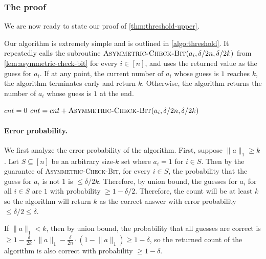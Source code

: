 \subsubsection{The proof}
We are now ready to state our proof of \cref{thm:threshold-upper}.

Our algorithm is extremely simple and is outlined in \cref{algo:threshold}. It repeatedly calls the subroutine $\textsc{Asymmetric-Check-Bit}(a_i, \delta / 2n, \delta / 2k)$ from \cref{lem:asymmetric-check-bit} for every $i \in [n]$, and uses the returned value as the guess for $a_i$. If at any point, the current number of $a_i$ whose guess is $1$ reaches $k$, the algorithm terminates early and return $k$. Otherwise, the algorithm returns the number of $a_i$ whose guess is $1$ at the end.
\begin{algorithm}[ht]
\caption{}
\label{algo:threshold}
\begin{algorithmic}[1]
\State $cnt = 0$
\State $cnt = cnt + \textsc{Asymmetric-Check-Bit}(a_i, \delta / 2n, \delta / 2k)$
\EndIf
\EndFor
\State {}
\EndProcedure
\end{algorithmic}
\end{algorithm}
\paragraph{Error probability.} We first analyze the error probability of the algorithm. First, suppose $\lVert a \rVert_1 \ge k$. Let $S \subseteq [n]$ be an arbitrary size-$k$ set where $a_i = 1$ for $i \in S$. Then by the guarantee of \textsc{Asymmetric-Check-Bit}, for every $i \in S$, the probability that the guess for $a_i$ is not $1$ is $\le \delta / 2k$. Therefore, by union bound, the guesses for $a_i$ for all $i \in S$ are $1$ with probability $\ge 1-\delta/2$. Therefore, the count will be at least $k$ so the algorithm will return $k$ as the correct answer with error probability $\le \delta / 2 \le \delta$.

If $\lVert a \rVert_1 < k$, then by union bound, the probability that all guesses are correct is $\ge 1 - \frac{\delta}{2k} \cdot \lVert a \rVert_1 - \frac{\delta}{2n} \cdot (1 - \lVert a \rVert_1) \ge 1-\delta$, so the returned count of the algorithm is also correct with probability $\ge 1- \delta$.

